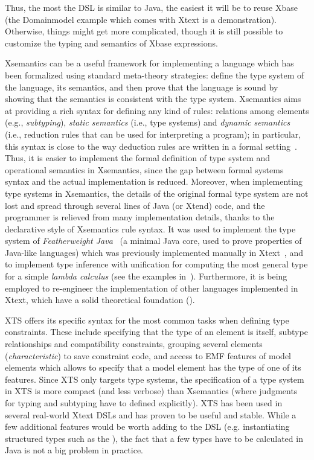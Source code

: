 Thus, the most the DSL is similar to Java, the easiest it will be to reuse Xbase
(the Domainmodel example which comes with Xtext is a demonstration).  Otherwise,
things might get more complicated, though it is still possible to customize the
typing and semantics of Xbase expressions.

Xsemantics can be a useful framework for implementing a language which has been
formalized using standard meta-theory strategies: define the type system of the
language, its semantics, and then prove that the language is sound by showing
that the semantics is consistent with the type system.
Xsemantics aims at providing a rich syntax for defining any kind of rules:
relations among elements (e.g., \emph{subtyping}), \emph{static semantics}
(i.e., type systems) and \emph{dynamic semantics} (i.e., reduction rules that
can be used for interpreting a program); in particular, this syntax is close to
the way deduction rules are written in a formal
setting~\cite{hindley:1997a,Pierce02}.  Thus, it is easier to implement the
formal definition of type system and operational semantics in Xsemantics, since
the gap between formal systems syntax and the actual implementation is reduced.
Moreover, when implementing type systems in Xsemantics, the details of the
original formal type system are not lost and spread through several lines of
Java (or Xtend) code, and the programmer is relieved from many implementation
details, thanks to the declarative style of Xsemantics rule syntax. It was used
to implement the type system of \emph{Featherweight
Java}~\cite{IgarashiPierceWadler:TOPLAS-2001} (a minimal Java core, used to
prove properties of Java-like languages) which was previously implemented
manually in Xtext~\cite{Bet10}, and to implement type inference with unification
for computing the most general type for a simple \emph{lambda calculus} (see the
examples in~\cite{lbts}).  Furthermore, it is being employed to re-engineer the
implementation of other languages implemented in Xtext, which have a solid
theoretical foundation (\cite{CompDelta,TraitRecordJ-SCP}).

XTS offers its specific syntax for the most common tasks when defining type
constraints. These include specifying that the type of an element is itself,
subtype relationships and compatibility constraints, grouping several elements
(\emph{characteristic}) to save constraint code, and access to EMF features of
model elements which allows to specify that a model element has the type of one
of its features.  Since XTS only targets type systems, the specification of a
type system in XTS is more compact (and less verbose) than Xsemantics (where
judgments for typing and subtyping have to defined explicitly).
XTS has been used in several real-world Xtext DSLs and has
proven to be useful and stable. While a few additional features would be worth
adding to the DSL (e.g. instantiating structured types such as the
), the fact that a few types have to be calculated in Java is not
a big problem in practice.

